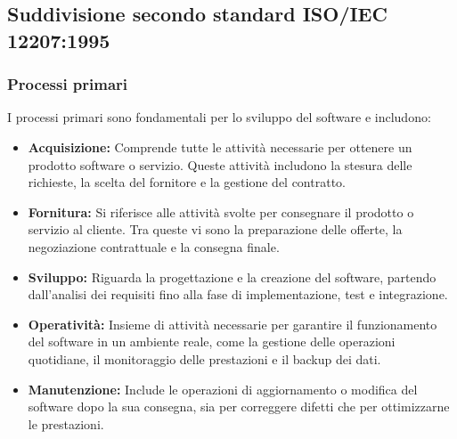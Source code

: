 \subsection{Suddivisione secondo standard ISO/IEC 12207:1995}

\subsubsection{Processi primari}
I processi primari sono fondamentali per lo sviluppo del software e includono:
\begin{itemize}
    \item \textbf{Acquisizione:} Comprende tutte le attività necessarie per ottenere un prodotto software o servizio. Queste attività includono la stesura delle richieste, la scelta del fornitore e la gestione del contratto.
    \item \textbf{Fornitura:} Si riferisce alle attività svolte per consegnare il prodotto o servizio al cliente. Tra queste vi sono la preparazione delle offerte, la negoziazione contrattuale e la consegna finale.
    \item \textbf{Sviluppo:} Riguarda la progettazione e la creazione del software, partendo dall'analisi dei requisiti fino alla fase di implementazione, test e integrazione.
    \item \textbf{Operatività:} Insieme di attività necessarie per garantire il funzionamento del software in un ambiente reale, come la gestione delle operazioni quotidiane, il monitoraggio delle prestazioni e il backup dei dati.
    \item \textbf{Manutenzione:} Include le operazioni di aggiornamento o modifica del software dopo la sua consegna, sia per correggere difetti che per ottimizzarne le prestazioni.
\end{itemize}

